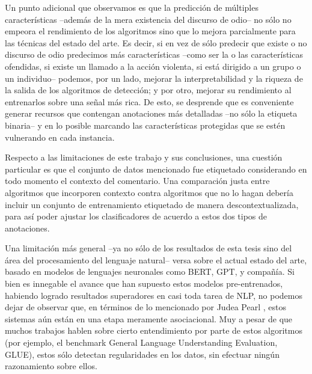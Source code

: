 Un punto adicional que observamos es que la predicción de múltiples características --además de la mera existencia del discurso de odio-- no sólo no empeora el rendimiento de los algoritmos sino que lo mejora parcialmente para las técnicas del estado del arte. Es decir, si en vez de sólo predecir que existe o no discurso de odio predecimos más características --como ser la o las características ofendidas, si existe un llamado a la acción violenta, si está dirigido a un grupo o un individuo-- podemos, por un lado, mejorar la interpretabilidad y la riqueza de la salida de los algoritmos de detección; y por otro, mejorar su rendimiento al entrenarlos sobre una señal más rica. De esto, se desprende que es conveniente generar recursos que contengan anotaciones más detalladas --no sólo la etiqueta binaria-- y en lo posible marcando las características protegidas que se estén vulnerando en cada instancia.


Respecto a las limitaciones de este trabajo y sus conclusiones, una cuestión particular es que el conjunto de datos mencionado fue etiquetado considerando en todo momento el contexto del comentario. Una comparación justa entre algoritmos que incorporen contexto contra algoritmos que no lo hagan debería incluir un conjunto de entrenamiento etiquetado de manera descontextualizada, para así poder ajustar los clasificadores de acuerdo a estos dos tipos de anotaciones.

Una limitación más general --ya no sólo de los resultados de esta tesis sino del área del procesamiento del lenguaje natural-- versa sobre el actual estado del arte, basado en modelos de lenguajes neuronales como BERT, GPT, y compañía. Si bien es innegable el avance que han supuesto estos modelos pre-entrenados, habiendo logrado resultados superadores en casi toda tarea de NLP, no podemos dejar de observar que, en términos de lo mencionado por Judea Pearl \cite{pearl2018book}, estos sistemas aún están en una etapa meramente asociacional. Muy a pesar de que muchos trabajos hablen sobre cierto entendimiento por parte de estos algoritmos (por ejemplo, el benchmark General Language Understanding Evaluation, GLUE), estos sólo detectan regularidades en los datos, sin efectuar ningún razonamiento sobre ellos.

